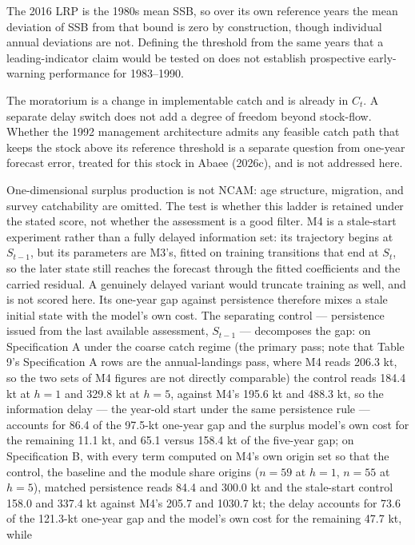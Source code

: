 \documentclass[11pt]{article}
\begin{document}
The 2016 LRP is the 1980s mean SSB, so over its own reference years the
mean deviation of SSB from that bound is zero by construction, though
individual annual deviations are not. Defining the threshold from the
same years that a leading-indicator claim would be tested on does not
establish prospective early-warning performance for 1983--1990.

The moratorium is a change in implementable catch and is already in
\(C_t\). A separate delay switch does not add a degree of freedom beyond
stock-flow. Whether the 1992 management architecture admits any feasible
catch path that keeps the stock above its reference threshold is a
separate question from one-year forecast error, treated for this stock
in Abaee (2026c), and is not addressed
here.

One-dimensional surplus production is not NCAM: age structure,
migration, and survey catchability are omitted. The test is whether this
ladder is retained under the stated score, not whether the assessment is
a good filter. M4 is a stale-start experiment rather than a fully delayed information
set: its trajectory begins at \(S_{t-1}\), but its parameters are
M3's, fitted on training transitions that end at \(S_t\), so the
later state still reaches the forecast through the fitted coefficients
and the carried residual. A genuinely delayed variant would truncate
training as well, and is not scored here. Its one-year gap against
persistence therefore mixes a stale initial state with the model's own
cost. The separating control --- persistence issued from the last
available assessment, \(S_{t-1}\) --- decomposes the gap: on
Specification A under the coarse catch regime (the primary pass; note
that Table 9's Specification A rows are the annual-landings pass, where
M4 reads 206.3 kt, so the two sets of M4 figures are not directly
comparable) the control reads 184.4 kt at \(h = 1\) and 329.8 kt at
\(h = 5\), against M4's 195.6 kt and 488.3 kt, so the information delay
--- the year-old start under the same persistence rule --- accounts for
86.4 of the 97.5-kt one-year gap and the surplus model's own cost for
the remaining 11.1 kt, and 65.1 versus 158.4 kt of the five-year gap; on
Specification B, with every term computed on M4's own origin set so
that the control, the baseline and the module share origins (\(n=59\)
at \(h=1\), \(n=55\) at \(h=5\)), matched persistence reads 84.4 and
300.0 kt and the stale-start control 158.0 and 337.4 kt against M4's
205.7 and 1030.7 kt; the delay accounts for 73.6 of the 121.3-kt
one-year gap and the model's own cost for the remaining 47.7 kt, while
\end{document}
